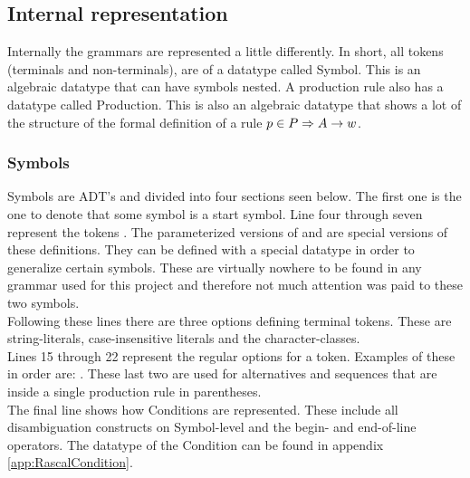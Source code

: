 \pagebreak


\subsection{Internal representation}
Internally the grammars are represented a little differently. In short, all tokens (terminals and non-terminals), are of a datatype called Symbol. This is an algebraic datatype that can have symbols nested. A production rule also has a datatype called Production. This is also an algebraic datatype that shows a lot of the structure of the formal definition of a rule $p \in P \Rightarrow A \rightarrow w$.
\subsubsection{Symbols}
Symbols are ADT's and divided into four sections seen below. The first one is the one to denote that some symbol is a start symbol. Line four through seven represent the tokens . The parameterized versions of  and  are special versions of these definitions. They can be defined with a special datatype in order to generalize certain symbols. These are virtually nowhere to be found in any grammar used for this project and therefore not much attention was paid to these two symbols.\\ 
Following these lines there are three options defining terminal tokens. These are string-literals, case-insensitive literals and the character-classes.\\
Lines 15 through 22 represent the regular options for a token. Examples of these in order are: . These last two are used for alternatives and sequences that are inside a single production rule in parentheses.\\
The final line shows how Conditions are represented. These include all disambiguation constructs on Symbol-level and the begin- and end-of-line operators. The datatype of the Condition can be found in appendix \ref{app:RascalCondition}. 

